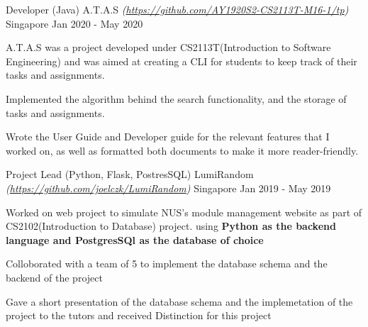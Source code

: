 \begin{cventries}
  \cventry
  {Developer (Java)} %
  {A.T.A.S \textmd{\em\tiny(\url{https://github.com/AY1920S2-CS2113T-M16-1/tp})}} %
  {Singapore} %
  {Jan 2020 - May 2020} %
  {
    \begin{cvitems} %
      \item {A.T.A.S was a project developed under CS2113T(Introduction to Software Engineering) and was aimed at creating a CLI for students to keep track of their tasks and assignments.}
      \item {Implemented the algorithm behind the search functionality, and the storage of tasks and assignments.}
      \item {Wrote the User Guide and Developer guide for the relevant features that I worked on, as well as formatted both documents to make it more reader-friendly.}
    \end{cvitems}
  }
  \cventry
  {Project Lead (Python, Flask, PostresSQL)} %
  {LumiRandom \textmd{\em\tiny(\url{https://github.com/joelczk/LumiRandom})}} %
  {Singapore} %
  {Jan 2019 - May 2019} %
  {
    \begin{cvitems} %
      \item {Worked on web project to simulate NUS's module management website as part of CS2102(Introduction to Database) project. using \textbf{Python as the backend language and PostgresSQl as the database of choice}}
      \item {Colloborated with a team of 5 to implement the database schema and the backend of the project}
      \item {Gave a short presentation of the database schema and the implemetation of the project to the tutors and received Distinction for this project}
    \end{cvitems}
  }



\end{cventries}

